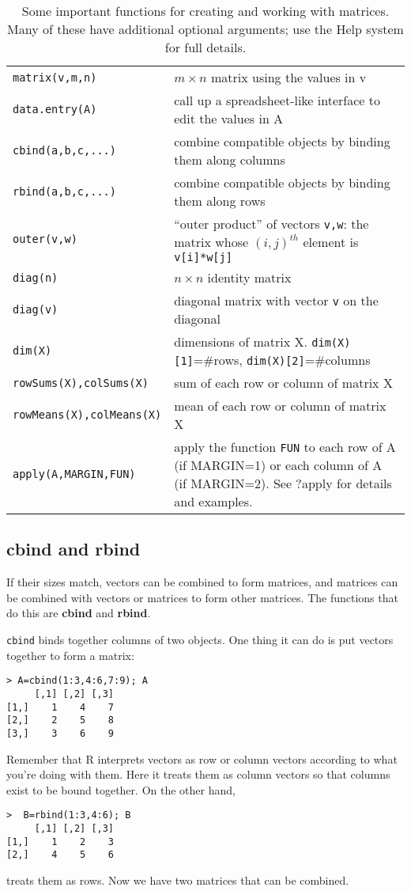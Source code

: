 \documentclass [11pt]{article}
\newcommand{\blst}{\vspace{-0.035in} \begin{lstlisting}}
\newcommand{\ttt}[1]{\texttt{#1}}
\numberwithin{exercise}{section}
\def\R{R }
\begin{document}
\begin{table}[t]
\begin{tabular}{p{128pt}p{300pt}}
\hline
{\tt matrix(v,m,n)} & $m \times n$ matrix using the values in v \\
{\tt data.entry(A)} & call up a spreadsheet-like interface to edit the values in A \\
{\tt cbind(a,b,c,...)} & combine compatible objects by binding them along columns \\
{\tt rbind(a,b,c,...)} & combine compatible objects by binding them along rows \\
{\tt outer(v,w)} & ``outer product'' of vectors \ttt{v,w}: the matrix whose $(i,j)^{th}$
element is \ttt{v[i]*w[j]} \\
{\tt diag(n)} & $n \times n$ identity matrix \\
{\tt diag(v)} & diagonal matrix with vector \texttt{v} on the diagonal \\
{\tt dim(X)} & dimensions of matrix X. \ttt{dim(X)[1]}=\#rows, \ttt{dim(X)[2]}=\#columns \\
{\tt rowSums(X),colSums(X)} & sum of each row or column of matrix X  \\
{\tt rowMeans(X),colMeans(X)} & mean of each row or column of matrix X  \\
{\tt apply(A,MARGIN,FUN)} & apply the function \ttt{FUN} to each row of A (if MARGIN=1) or each 
column of A (if MARGIN=2). See ?apply for details and examples. \\
\hline
\end{tabular}
\caption{Some important functions for creating and working with matrices. Many
of these have additional optional arguments; use the Help system for full details.}
\label{MatrixFunctions}
\end{table}

\subsection{cbind and rbind} 
If their sizes match, vectors can be combined to form matrices, and matrices
can be combined with vectors or matrices to form other matrices. The functions
that do this are \textbf{cbind} and \textbf{rbind}. 

\texttt{cbind} binds together columns of two objects. One thing it can do
is put vectors together to form a matrix: 
\blst
> A=cbind(1:3,4:6,7:9); A
     [,1] [,2] [,3]
[1,]    1    4    7
[2,]    2    5    8
[3,]    3    6    9
\end{lstlisting}
Remember that \R interprets vectors as row or column vectors according to
what you're doing with them. Here it treats them as column vectors so that 
columns exist to be bound together. On the other hand, 
\blst
>  B=rbind(1:3,4:6); B
     [,1] [,2] [,3]
[1,]    1    2    3
[2,]    4    5    6
\end{lstlisting}
treats them as rows. Now we have two matrices that can be combined. 
\end{document}
